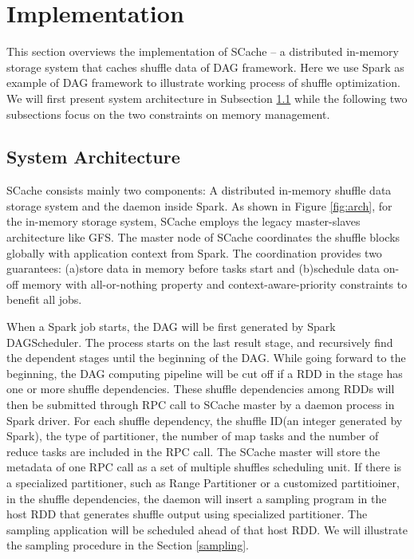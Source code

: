 \section{Implementation}\label{impl}
This section overviews the implementation of SCache -- a distributed in-memory storage system that caches shuffle data of DAG framework. Here we use Spark as example of DAG framework to illustrate working process of shuffle optimization. We will first present system architecture in Subsection \ref{arch} while the following two subsections focus on the two constraints on memory management.

\subsection{System Architecture}\label{arch}
SCache consists mainly two components: A distributed in-memory shuffle data storage system and the daemon inside Spark. As shown in Figure \ref{fig:arch}, for the in-memory storage system, SCache employs the legacy master-slaves architecture like GFS\cite{gfs}. The master node of SCache coordinates the shuffle blocks globally with application context from Spark. The coordination provides two guarantees: (a)store data in memory before tasks start and (b)schedule data on-off memory with all-or-nothing property and context-aware-priority constraints to benefit all jobs. 

When a Spark job starts, the DAG will be first generated by Spark DAGScheduler\cite{sparksource}. The process starts on the last result stage, and recursively find the dependent stages until the beginning of the DAG. While going forward to the beginning, the DAG computing pipeline will be cut off if a RDD in the stage has one or more shuffle dependencies. These shuffle dependencies among RDDs will then be submitted through RPC call to SCache master by a daemon process in Spark driver. For each shuffle dependency, the shuffle ID(an integer generated by Spark), the type of partitioner, the number of map tasks and the number of reduce tasks are included in the RPC call. The SCache master will store the metadata of one RPC call as a set of multiple shuffles scheduling unit. If there is a specialized partitioner, such as Range Partitioner or a customized partitioiner, in the shuffle dependencies, the daemon will insert a sampling program in the host RDD that generates shuffle output using specialized partitioner. The sampling application will be scheduled ahead of that host RDD. We will illustrate the sampling procedure in the Section \ref{sampling}.


